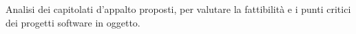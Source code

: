 Analisi dei capitolati d’appalto proposti, per valutare la fattibilità e i punti critici dei progetti software in oggetto.
